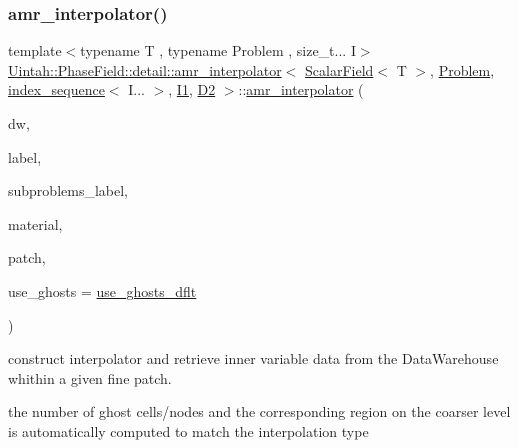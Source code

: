 \subsubsection{\texorpdfstring{amr\+\_\+interpolator()}{amr\_interpolator()}\hspace{0.1cm}{\footnotesize\ttfamily [3/4]}}
{\footnotesize\ttfamily template$<$typename T , typename Problem , size\+\_\+t... I$>$ \\
\hyperlink{classUintah_1_1PhaseField_1_1detail_1_1amr__interpolator}{Uintah\+::\+Phase\+Field\+::detail\+::amr\+\_\+interpolator}$<$ \hyperlink{structUintah_1_1PhaseField_1_1ScalarField}{Scalar\+Field}$<$ T $>$, \hyperlink{classUintah_1_1PhaseField_1_1Problem}{Problem}, \hyperlink{namespaceUintah_1_1PhaseField_a237de804d99512e50613aff7c94a9461}{index\+\_\+sequence}$<$ I... $>$, \hyperlink{namespaceUintah_1_1PhaseField_a547ce3002aa97fbd3ef3192a6eec8406a66f19efe774b0d2b6e5844eb2d83d305}{I1}, \hyperlink{namespaceUintah_1_1PhaseField_a12bfc68444894dffdf0cb8d9cf0cc76aa1a451dae278b0103a94105c8776e9a67}{D2} $>$\+::\hyperlink{classUintah_1_1PhaseField_1_1detail_1_1amr__interpolator}{amr\+\_\+interpolator} (\begin{DoxyParamCaption}\item[{Data\+Warehouse $\ast$}]{dw,  }\item[{const Var\+Label $\ast$}]{label,  }\item[{const Var\+Label $\ast$}]{subproblems\+\_\+label,  }\item[{int}]{material,  }\item[{const Patch $\ast$}]{patch,  }\item[{bool}]{use\+\_\+ghosts = {\ttfamily \hyperlink{classUintah_1_1PhaseField_1_1detail_1_1amr__interpolator_3_01ScalarField_3_01T_01_4_00_01Problemd2db9de1754b5450c93c191a9275f5ed_a05a1e360547dde624240ae943f6ced4b}{use\+\_\+ghosts\+\_\+dflt}} }\end{DoxyParamCaption})\hspace{0.3cm}{\ttfamily [inline]}}



construct interpolator and retrieve inner variable data from the Data\+Warehouse whithin a given fine patch. 

the number of ghost cells/nodes and the corresponding region on the coarser level is automatically computed to match the interpolation type


